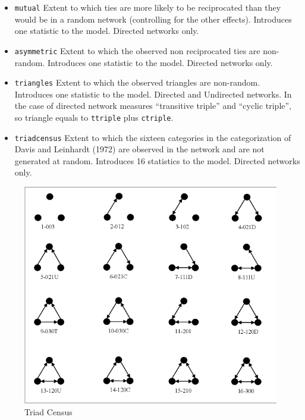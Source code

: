\documentclass[
]{article}
\begin{document}
\begin{itemize}
\item
  \texttt{mutual} Extent to which ties are more likely to be
  reciprocated than they would be in a random network (controlling for
  the other effects). Introduces one statistic to the model. Directed
  networks only.
\item
  \texttt{asymmetric} Extent to which the observed non reciprocated ties
  are non-random. Introduces one statistic to the model. Directed
  networks only.
\item
  \texttt{triangles} Extent to which the observed triangles are
  non-random. Introduces one statistic to the model. Directed and
  Undirected networks. In the case of directed network measures
  ``transitive triple'' and ``cyclic triple'', so triangle equals to
  \texttt{ttriple} plus \texttt{ctriple}.
\item
  \texttt{triadcensus} Extent to which the sixteen categories in the
  categorization of Davis and Leinhardt (1972) are observed in the
  network and are not generated at random. Introduces 16 statistics to
  the model. Directed networks only.
\end{itemize}

\begin{figure}
\centering
\includegraphics{triad_census.png}
\caption{Triad Census}
\end{figure}
\end{document}
